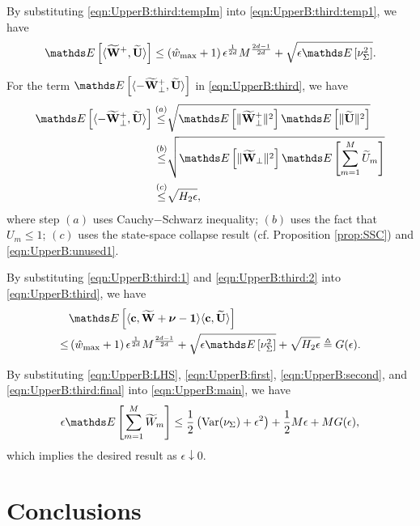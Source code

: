 \documentclass[10pt, conference, letterpaper]{IEEEtran} %
\begin{document}
By substituting \eqref{eqn:UpperB:third:tempIm} into \eqref{eqn:UpperB:third:temp1}, we have 
\begin{align}
\label{eqn:UpperB:third:1}
\bE\left[\langle\wt{\mb{W}}^{+},\wt{\mb{U}}\rangle\right]\leq\left(\hat{w}_{\max}+1\right)\epsilon^{\frac{1}{2d}}M^{\frac{2d-1}{2d}}+\sqrt{\epsilon\bE\left[\nu_{\Sigma}^2\right]}.
\end{align}

For the term $\bE\left[\langle-\wt{\mb{W}}^{+}_{\perp},\wt{\mb{U}}\rangle\right]$ in \eqref{eqn:UpperB:third}, we have
\begin{align}
\label{eqn:UpperB:third:2}
\bE\left[\langle-\wt{\mb{W}}^{+}_{\perp},\wt{\mb{U}}\rangle\right]\stackrel{(a)}{\leq}&\sqrt{\bE\left[\|\wt{\mb{W}}_{\perp}^{+}\|^2\right]\bE\left[\|\wt{\mb{U}}\|^2\right]}\nonumber\\
\stackrel{(b)}{\leq}&\sqrt{\bE\left[\|\wt{\mb{W}}_{\perp}\|^2\right]\bE\left[\sum_{m=1}^{M}\wt{U}_m\right]} \nonumber\\
\stackrel{(c)}{\leq}&\sqrt{H_2\epsilon},
\end{align}
where step $(a)$ uses Cauchy$-$Schwarz inequality; $(b)$ uses the fact that $U_m\leq1$; $(c)$ uses the state-space collapse result (cf. Proposition \ref{prop:SSC}) and \eqref{eqn:UpperB:unused1}.

By substituting \eqref{eqn:UpperB:third:1} and \eqref{eqn:UpperB:third:2} into \eqref{eqn:UpperB:third}, we have 
\begin{align}
\label{eqn:UpperB:third:final}
&\bE\left[\langle\mb{c},\wt{\mb{W}}+\bs{\nu}-\mb{1}\rangle\langle\mb{c},\wt{\mb{U}}\rangle\right] \nonumber\\
\leq&\left(\hat{w}_{\max}+1\right)\epsilon^{\frac{1}{2d}}M^{\frac{2d-1}{2d}}+\sqrt{\epsilon\bE\left[\nu_{\Sigma}^2\right]}+\sqrt{H_2\epsilon}\triangleq G(\epsilon).
\end{align}

By substituting \eqref{eqn:UpperB:LHS}, \eqref{eqn:UpperB:first}, \eqref{eqn:UpperB:second}, and \eqref{eqn:UpperB:third:final} into \eqref{eqn:UpperB:main}, we have 
\begin{align*}
\epsilon\bE\left[\sum_{m=1}^{M}\wt{W}_m\right]\leq\frac{1}{2}\left(\text{Var}(\nu_{\Sigma})+\epsilon^2\right)+\frac{1}{2}M\epsilon+MG(\epsilon),
\end{align*}
which implies the desired result as $\epsilon\downarrow0$.

\section{Conclusions}
\end{document}
